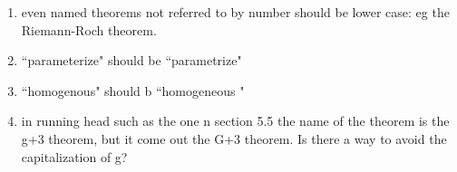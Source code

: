 \documentclass[12pt, leqno]{book}
\begin{document}
\begin{enumerate}
 \item even named theorems not referred to by number should be lower case: eg the Riemann-Roch theorem. 
 
 \item  ``parameterize" should be  ``parametrize"
 
\item ``homogenous" should b ``homogeneous " 

\item in running head such as the one n section 5.5 the name of the theorem is the g+3 theorem, but it come out the G+3 theorem.
Is there a way to avoid the capitalization of g?
 
 \end{enumerate}
\end{document}
